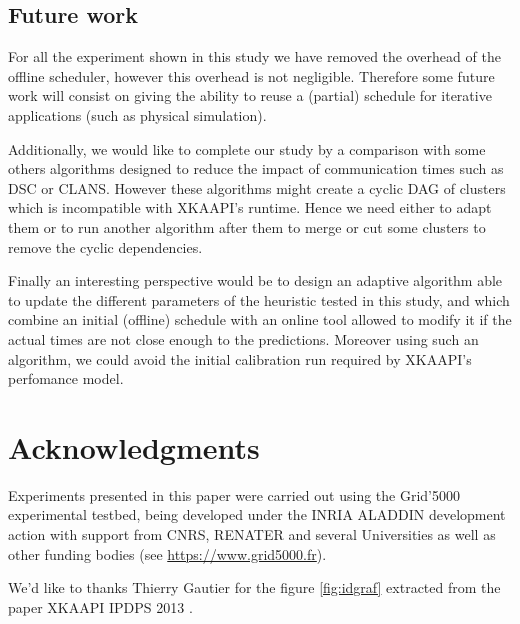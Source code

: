 \documentclass[10pt, conference, compsocconf,pdftex,dvipsnames]{IEEEtran}
\newcommand{\mytodo}[1]{\todo[inline]{#1}}
\begin{document}
\subsection{Future work }
\label{chap:cncl-work}

For all the experiment shown in this study we have removed the overhead of the
offline scheduler, however this overhead is not negligible. Therefore some
future work will consist on giving the ability to reuse a (partial) schedule
for iterative applications (such as physical simulation).

Additionally, we would like to complete our study by a comparison with some
others algorithms designed to reduce the impact of communication times such as
DSC or CLANS. However these algorithms might create a cyclic DAG of clusters
which is incompatible with XKAAPI's runtime. Hence we need either to adapt
them or to run another algorithm after them to merge or cut some clusters to
remove the cyclic dependencies.

Finally an interesting perspective would be to design an adaptive algorithm
able to update the different parameters of the heuristic tested in this study,
and which combine an initial (offline) schedule with an online tool allowed to
modify it if the actual times are not close enough to the predictions. Moreover
using such an algorithm, we could avoid the initial calibration run required
by XKAAPI's perfomance model.

\section*{Acknowledgments}

Experiments presented in this paper were carried out using the Grid'5000
experimental testbed, being developed under the INRIA ALADDIN development 
action with support from CNRS, RENATER and several Universities as well as
other funding bodies (see \url{https://www.grid5000.fr}).


We'd like to thanks Thierry Gautier for the figure \ref{fig:idgraf} extracted
from the paper XKAAPI IPDPS 2013 \cite{gautierxkaapi}.






\mytodo{Remove the todo list}
\listoftodos



\end{document}
